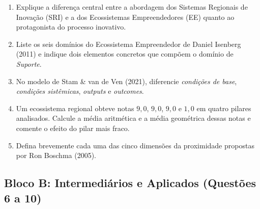 \begin{enumerate}[leftmargin=1.6em, itemsep=6pt]
  \item Explique a diferença central entre a abordagem dos Sistemas Regionais de Inovação (SRI) e a dos Ecossistemas Empreendedores (EE) quanto ao protagonista do processo inovativo.
  \espacoResolucao[1.8cm]

  \item Liste os seis domínios do Ecossistema Empreendedor de Daniel Isenberg (2011) e indique dois elementos concretos que compõem o domínio de \textit{Suporte}.
  \espacoResolucao[1.8cm]

  \item No modelo de Stam \& van de Ven (2021), diferencie \textit{condições de base}, \textit{condições sistêmicas}, \textit{outputs} e \textit{outcomes}.
  \espacoResolucao[1.8cm]

  \item Um ecossistema regional obteve notas $9{,}0$, $9{,}0$, $9{,}0$ e $1{,}0$ em quatro pilares analisados. Calcule a média aritmética e a média geométrica dessas notas e comente o efeito do pilar mais fraco.
  \espacoResolucao[1.8cm]

  \item Defina brevemente cada uma das cinco dimensões da proximidade propostas por Ron Boschma (2005).
  \espacoResolucao[1.8cm]
\end{enumerate}

\subsection*{Bloco B: Intermediários e Aplicados (Questões 6 a 10)}

